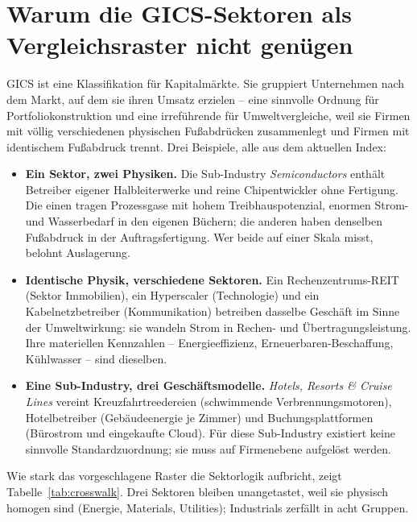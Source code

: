 \documentclass[11pt,a4paper]{article}
\begin{document}
\section{Warum die GICS-Sektoren als Vergleichsraster nicht genügen}

GICS ist eine Klassifikation für Kapitalmärkte. Sie gruppiert Unternehmen nach dem Markt, auf dem sie ihren Umsatz erzielen -- eine sinnvolle Ordnung für Portfoliokonstruktion und eine irreführende für Umweltvergleiche, weil sie Firmen mit völlig verschiedenen physischen Fußabdrücken zusammenlegt und Firmen mit identischem Fußabdruck trennt. Drei Beispiele, alle aus dem aktuellen Index:

\begin{itemize}
\item \textbf{Ein Sektor, zwei Physiken.} Die Sub-Industry \emph{Semiconductors} enthält Betreiber eigener Halbleiterwerke und reine Chipentwickler ohne Fertigung. Die einen tragen Prozessgase mit hohem Treibhauspotenzial, enormen Strom- und Wasserbedarf in den eigenen Büchern; die anderen haben denselben Fußabdruck in der Auftragsfertigung. Wer beide auf einer Skala misst, belohnt Auslagerung.
\item \textbf{Identische Physik, verschiedene Sektoren.} Ein Rechenzentrums-REIT (Sektor Immobilien), ein Hyperscaler (Technologie) und ein Kabelnetzbetreiber (Kommunikation) betreiben dasselbe Geschäft im Sinne der Umweltwirkung: sie wandeln Strom in Rechen- und Übertragungsleistung. Ihre materiellen Kennzahlen -- Energieeffizienz, Erneuerbaren-Beschaffung, Kühlwasser -- sind dieselben.
\item \textbf{Eine Sub-Industry, drei Geschäftsmodelle.} \emph{Hotels, Resorts \& Cruise Lines} vereint Kreuzfahrtreedereien (schwimmende Verbrennungsmotoren), Hotelbetreiber (Gebäudeenergie je Zimmer) und Buchungsplattformen (Bürostrom und eingekaufte Cloud). Für diese Sub-Industry existiert keine sinnvolle Standardzuordnung; sie muss auf Firmenebene aufgelöst werden.
\end{itemize}

Wie stark das vorgeschlagene Raster die Sektorlogik aufbricht, zeigt Tabelle~\ref{tab:crosswalk}. Drei Sektoren bleiben unangetastet, weil sie physisch homogen sind (Energie, Materials, Utilities); Industrials zerfällt in acht Gruppen.

\begin{table}[htbp]
\caption{Wie sich die \NSectors{} GICS-Sektoren auf die \NGroups{} Vergleichsgruppen verteilen}
\label{tab:crosswalk}
\small

\end{table}
\end{document}

